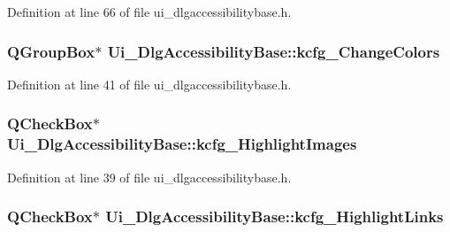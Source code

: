 Definition at line 66 of file ui\+\_\+dlgaccessibilitybase.\+h.

\hypertarget{classUi__DlgAccessibilityBase_ad69ec5ae9e5bad5756a57dac036500eb}{
\subsubsection[{kcfg\+\_\+\+Change\+Colors}]{\setlength{\rightskip}{0pt plus 5cm}Q\+Group\+Box$\ast$ Ui\+\_\+\+Dlg\+Accessibility\+Base\+::kcfg\+\_\+\+Change\+Colors}}\label{classUi__DlgAccessibilityBase_ad69ec5ae9e5bad5756a57dac036500eb}


Definition at line 41 of file ui\+\_\+dlgaccessibilitybase.\+h.

\hypertarget{classUi__DlgAccessibilityBase_a06bcf6b5838dd7dd61e796416b064b6b}{
\subsubsection[{kcfg\+\_\+\+Highlight\+Images}]{\setlength{\rightskip}{0pt plus 5cm}Q\+Check\+Box$\ast$ Ui\+\_\+\+Dlg\+Accessibility\+Base\+::kcfg\+\_\+\+Highlight\+Images}}\label{classUi__DlgAccessibilityBase_a06bcf6b5838dd7dd61e796416b064b6b}


Definition at line 39 of file ui\+\_\+dlgaccessibilitybase.\+h.

\hypertarget{classUi__DlgAccessibilityBase_aa5b4ab2a5fa80185e567cdfd3af9b3c8}{
\subsubsection[{kcfg\+\_\+\+Highlight\+Links}]{\setlength{\rightskip}{0pt plus 5cm}Q\+Check\+Box$\ast$ Ui\+\_\+\+Dlg\+Accessibility\+Base\+::kcfg\+\_\+\+Highlight\+Links}}\label{classUi__DlgAccessibilityBase_aa5b4ab2a5fa80185e567cdfd3af9b3c8}


